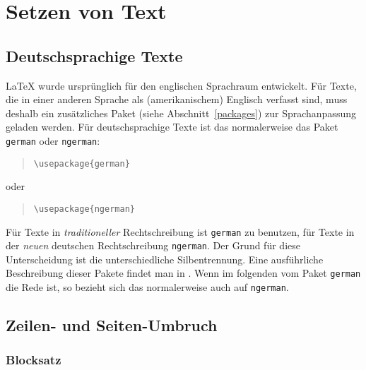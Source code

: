  
\section{Setzen von Text}
 

\subsection{Deutschsprachige Texte}\label{deutsch}
\LaTeX{} wurde ursprünglich für den englischen Sprachraum entwickelt.
Für Texte, die in einer anderen Sprache als (amerikanischem)
Englisch verfasst sind, muss deshalb ein zusätzliches Paket 
(siehe Abschnitt~\ref{packages}) zur Sprachanpassung geladen werden.  
Für deutschsprachige Texte ist das normalerweise das Paket \texttt{german} 
oder \texttt{ngerman}:
\begin{verse}
\verb:\usepackage{german}:
\end{verse}
oder
\begin{verse}
\verb:\usepackage{ngerman}:
\end{verse}
Für Texte in \emph{traditioneller} Rechtschreibung ist \texttt{german}
zu benutzen, für Texte in der \emph{neuen} deutschen Rechtschreibung
\texttt{ngerman}.
Der Grund für diese Unterscheidung ist die unterschiedliche Silbentrennung.
Eine ausführliche Beschreibung dieser Pakete findet man in \cite{germdoc}.  
Wenn im folgenden vom Paket \texttt{german} die Rede ist, 
so bezieht sich das normalerweise auch auf \texttt{ngerman}.


\subsection{Zeilen- und Seiten-Umbruch}

\subsubsection{Blocksatz}

